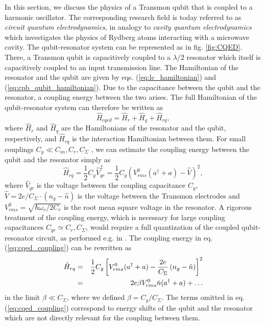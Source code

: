 In this section, we discuss the physics of a Transmon qubit that is coupled to a harmonic oscillator. The corresponding research field is today referred to as {\it circuit quantum electrodynamics}, in analogy to {\it cavity quantum electrodynamics} which investigates the physics of Rydberg atoms interacting with a microwave cavity. The qubit-resonator system can be represented as in fig. \ref{fig:CQED}. There, a Transmon qubit is capacitively coupled to a $\lambda/2$ resonator which itself is capacitively coupled to an input transmission line. The Hamiltonian of the resonator and the qubit are given by eqs. (\ref{eq:lc_hamiltonian}) and (\ref{eq:cpb_qubit_hamiltonian}). Due to the capacitance between the qubit and the resonator, a coupling energy between the two arises. The full Hamiltonian of the qubit-resonator system can therefore be written as
%
\begin{equation}
\hat{H}_{cqed} = \hat{H}_r+\hat{H}_q+\hat{H}_{rq},
\end{equation}
%
where $\hat{H}_{r}$ and $\hat{H}_q$ are the Hamiltonians of the resonator and the qubit, respectively, and $\hat{H}_{rq}$ is the interaction Hamiltonian between them. For small couplings $C_g \ll C_{in},C_r,C_\Sigma$ , we can estimate the coupling energy between the qubit and the resonator simply as
%
\begin{equation}
\hat{H}_{rq} = \frac{1}{2}C_{g}\hat{V}_{qr}^2 = \frac{1}{2}C_g\left(V^0_{rms}(a^\dagger+a)-\hat{V}\right)^2, \label{eq:cqed_coupling}
\end{equation}
%
where $\hat{V}_{qr}$ is the voltage between the coupling capacitance $C_g$, $\hat{V}=2e/C_\Sigma \cdot(n_g-\hat{n})$ is the voltage between the Transmon electrodes and $V^0_{rms} = \sqrt{\hbar \omega_r/2C_r}$ is the root mean square voltage in the resonator. A rigorous treatment of the coupling energy, which is necessary for large coupling capacitances $C_{qr}\simeq C_{r},C_\Sigma$, would require a full quantization of the coupled qubit-resonator circuit, as performed e.g. in \citep{nguyen_cooper_2008}. The coupling energy in eq. (\ref{eq:cqed_coupling}) can be rewritten as
%
\begin{eqnarray}
\hat{H}_{rq} & = & \frac{1}{2}C_g\left[V_{rms}^0(a^\dagger+a)-\frac{2e}{C_\Sigma}\left(n_g-\hat{n}\right)\right]^2 \notag \\
       & = & 2e \beta V_{rms}^0\hat{n}(a^\dagger+a) + \hdots \label{eq:cqed_coupling}
\end{eqnarray}
%
in the limit $\beta \ll C_\Sigma$, where we defined $\beta = C_g/C_\Sigma$. The terms omitted in eq. (\ref{eq:cqed_coupling}) correspond to energy shifts of the qubit and the resonator which are not directly relevant for the coupling between them. 
